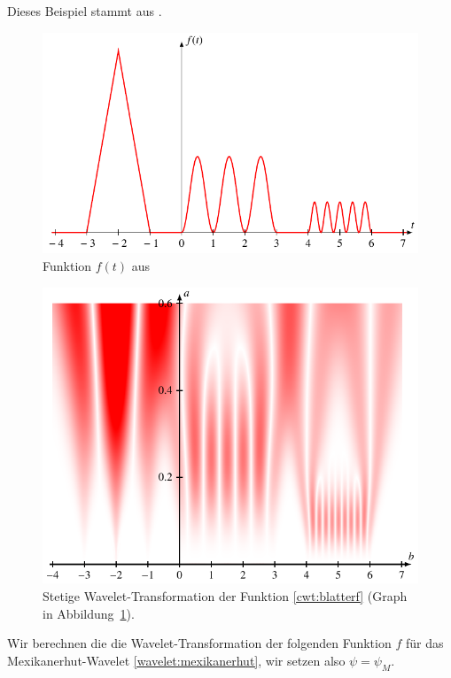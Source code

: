 \begin{beispiel}
Dieses Beispiel stammt aus \cite[p.~60]{buch:blatter}.
\begin{figure}
\centering
\includegraphics{chapters/4-cwt/images/f.pdf}
\caption{Funktion $f(t)$ aus \cite[p.~60]{buch:blatter}
\label{cwt:blatterfgraph}}
\end{figure}
\begin{figure}
\centering
\includegraphics{chapters/4-cwt/images/notes.pdf}
\caption{Stetige Wavelet-Transformation der Funktion \eqref{cwt:blatterf}
(Graph in Abbildung~\ref{cwt:blatterfgraph}).
\label{cwt:blattercwt}}
\end{figure}
Wir berechnen die die Wavelet-Transformation der folgenden Funktion $f$
für das Mexikanerhut-Wavelet \eqref{wavelet:mexikanerhut}, wir setzen also
$\psi=\psi_M$.
\begin{equation}

\end{equation}
\end{beispiel}
